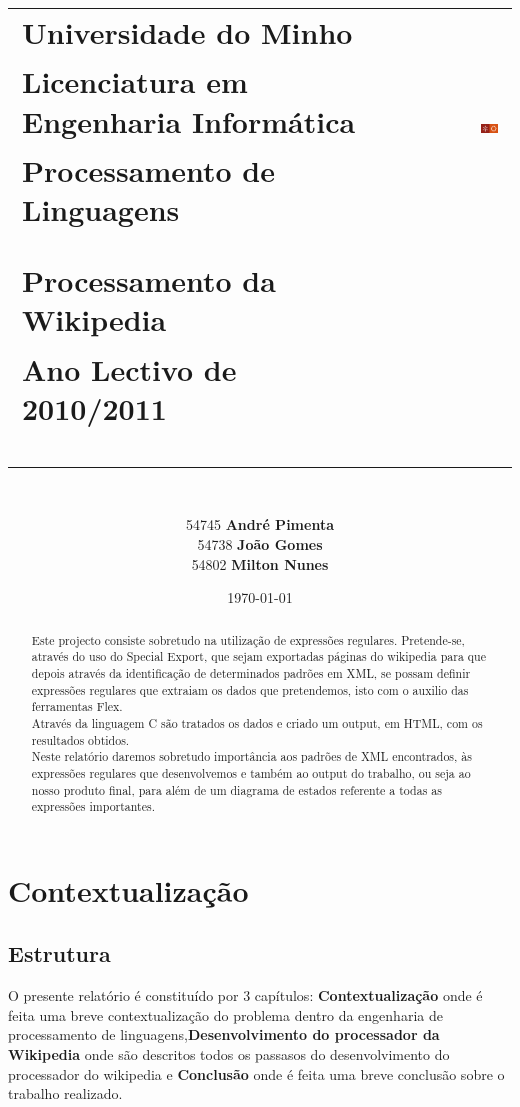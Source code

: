 \documentclass[a4paper,11pt,openright,openbib]{report}
\title{
	\begin{tabular}{l r}
	\large{Universidade do Minho} & \multirow{3}{*}{\includegraphics[width=0.2\textwidth]{imagens/UM}} \\
	\large{Licenciatura em Engenharia Informática} & \\
	\large{Processamento de Linguagens} & \\
	\\
	\\
	\Large{\textbf{Processamento da Wikipedia}} & \\
	\large{Ano Lectivo de 2010/2011} & \\
	\\
	\\
	\\
	\end{tabular}
}
\author{
	\begin{tabular}[t]{l}
	\\
	\\
	54745 \textbf{André Pimenta} \\
	54738 \textbf{João Gomes} \\ 
	54802 \textbf{Milton Nunes} \\
	\\ 
	\end{tabular}
}
\date{\today}
\begin{document}
\maketitle
{}


\begin{abstract}
Este projecto consiste sobretudo na utilização de expressões regulares. Pretende-se, através do uso do Special Export, que sejam exportadas páginas do wikipedia para que depois através da identificação de determinados padrões em XML, se possam definir expressões regulares que extraiam os dados que pretendemos, isto com o auxilio das ferramentas Flex.\\
Através da linguagem C são tratados os dados e criado um output, em HTML, com os resultados obtidos.\\
Neste relatório daremos sobretudo importância aos padrões de XML encontrados, às expressões regulares que desenvolvemos e também ao output do trabalho, ou seja ao nosso produto final, para além de um diagrama de estados referente a todas as expressões importantes.\\

\end{abstract}



\tableofcontents




\pagestyle{headings}
\newpage
\chapter{Contextualização}

\section{Estrutura}
O presente relatório é constituído por 3 capítulos: \textbf{Contextualização} onde é feita uma breve contextualização do problema dentro da engenharia de processamento de linguagens,\textbf{Desenvolvimento do processador da Wikipedia} onde são descritos todos os passasos do desenvolvimento do processador do wikipedia e \textbf{Conclusão} onde é feita uma breve conclusão sobre o trabalho realizado.
\end{document}
